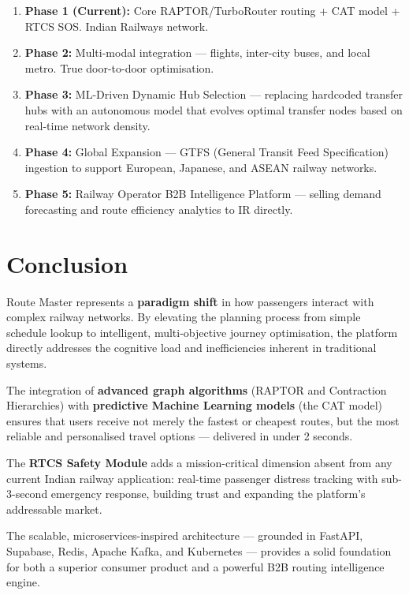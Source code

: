\documentclass[12pt,a4paper]{report}
\begin{document}
\begin{enumerate}[leftmargin=1.5em]
  \item \textbf{Phase 1 (Current):} Core RAPTOR/TurboRouter routing + CAT model + RTCS SOS. Indian Railways network.
  \item \textbf{Phase 2:} Multi-modal integration --- flights, inter-city buses, and local metro. True door-to-door optimisation.
  \item \textbf{Phase 3:} ML-Driven Dynamic Hub Selection --- replacing hardcoded transfer hubs with an autonomous model that evolves optimal transfer nodes based on real-time network density.
  \item \textbf{Phase 4:} Global Expansion --- GTFS (General Transit Feed Specification) ingestion to support European, Japanese, and ASEAN railway networks.
  \item \textbf{Phase 5:} Railway Operator B2B Intelligence Platform --- selling demand forecasting and route efficiency analytics to IR directly.
\end{enumerate}

\chapter{Conclusion}

Route Master represents a \textbf{paradigm shift} in how passengers interact with complex railway networks. By elevating the planning process from simple schedule lookup to intelligent, multi-objective journey optimisation, the platform directly addresses the cognitive load and inefficiencies inherent in traditional systems.

The integration of \textbf{advanced graph algorithms} (RAPTOR and Contraction Hierarchies) with \textbf{predictive Machine Learning models} (the CAT model) ensures that users receive not merely the fastest or cheapest routes, but the most reliable and personalised travel options --- delivered in under 2 seconds.

The \textbf{RTCS Safety Module} adds a mission-critical dimension absent from any current Indian railway application: real-time passenger distress tracking with sub-3-second emergency response, building trust and expanding the platform's addressable market.

The scalable, microservices-inspired architecture --- grounded in FastAPI, Supabase, Redis, Apache Kafka, and Kubernetes --- provides a solid foundation for both a superior consumer product and a powerful B2B routing intelligence engine.
\end{document}

